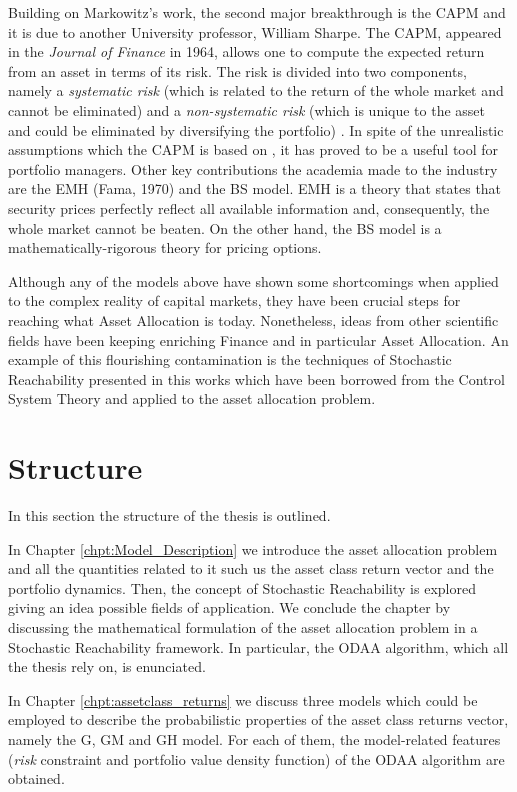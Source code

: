 Building on Markowitz's work, the second major breakthrough is the \gls{CAPM} and it is due to another University professor, William Sharpe. The \gls{CAPM}, appeared in the \textit{Journal of Finance} in 1964, allows one to compute the expected return from an asset in terms of its risk. The risk is divided into two components, namely a \textit{systematic risk} (which is related to the return of the whole market and cannot be eliminated) and a \textit{non-systematic risk} (which is unique to the asset and could be eliminated by diversifying the portfolio) \cite{hull2014}. In spite of the unrealistic assumptions which the \gls{CAPM} is based on \cite{hull2015risk},  it has proved to be a useful tool for portfolio managers. Other key contributions the academia made to the industry are the \gls{EMH} (Fama, 1970) and the \gls{BS} model. \gls{EMH} is a theory that states that security prices perfectly reflect all available information and, consequently, the whole market cannot be beaten. On the other hand, the \gls{BS} model is a mathematically-rigorous theory for pricing options.

Although any of the models above have shown some shortcomings when applied to the complex reality of capital markets, they have been crucial steps for reaching what Asset Allocation is today. Nonetheless, ideas from other scientific fields have been keeping enriching Finance and in particular Asset Allocation. An example of this flourishing contamination is the techniques of Stochastic Reachability presented in this works which have been borrowed from the Control System Theory and applied to the asset allocation problem.



\section{Structure}
In this section the structure of the thesis is outlined.

In Chapter \ref{chpt:Model_Description} we introduce the asset allocation problem and all the quantities related to it such us the asset class return vector and the portfolio dynamics. Then, the concept of Stochastic Reachability is explored giving an idea possible fields of application. We conclude the chapter by discussing the mathematical formulation of the asset allocation problem in a Stochastic Reachability framework. In particular, the \gls{ODAA} algorithm, which all the thesis rely on, is enunciated.

In Chapter \ref{chpt:assetclass_returns} we discuss three models which could be employed to describe the probabilistic properties of the asset class returns vector, namely the \gls{G}, \gls{GM} and \gls{GH} model. For each of them, the model-related features (\textit{risk} constraint and portfolio value density function) of the \gls{ODAA} algorithm are obtained.

